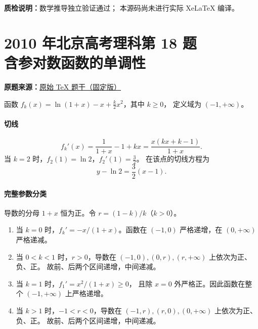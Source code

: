 \documentclass[UTF8,a4paper,11pt]{ctexart}
\begin{document}
\bigskip
\noindent\textbf{质检说明：}数学推导独立验证通过；
本源码尚未进行实际 XeLaTeX 编译。

\clearpage
{}
{}
\section*{2010 年北京高考理科第 18 题\\含参对数函数的单调性}
\noindent\textbf{原题来源：}\href{https://github.com/DxAThing/Gaokao-Math-Problems-Compilation/blob/f1ae169b58a75b3db6e35c670b3f0d5c78718188/content/2010/beijing_science.tex#L352}{原始 TeX 题干（固定版）}
\par
函数 $f_k(x)=\ln(1+x)-x+\frac{k}{2}x^2$，其中 $k\ge0$，
定义域为 $(-1,+\infty)$。

\paragraph{切线}
\[
 f_k'(x)=\frac1{1+x}-1+kx
        =\frac{x(kx+k-1)}{1+x}.
\]
当 $k=2$ 时，$f_2(1)=\ln2$，$f_2'(1)=\frac32$。
在该点的切线方程为
\[
 \boxed{y-\ln2=\frac32(x-1)}.
\]

\paragraph{完整参数分类}
导数的分母 $1+x$ 恒为正。令 $r=(1-k)/k$（$k>0$）。
\begin{enumerate}
\item 当 $k=0$ 时，$f_k'=-x/(1+x)$。函数在
$(-1,0)$ 严格递增，在 $(0,+\infty)$ 严格递减。
\item 当 $0<k<1$ 时，$r>0$，导数在
$(-1,0),(0,r),(r,+\infty)$ 上依次为正、负、正。
故前、后两个区间递增，中间递减。
\item 当 $k=1$ 时，$f_1'=x^2/(1+x)\ge0$，
且除 $x=0$ 外严格正。因此函数在整个
$(-1,+\infty)$ 上严格递增。
\item 当 $k>1$ 时，$-1<r<0$，导数在
$(-1,r),(r,0),(0,+\infty)$ 上依次为正、负、正。
故前、后两个区间递增，中间递减。
\end{enumerate}
\end{document}
